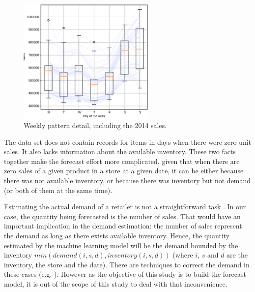 \begin{figure}
	\centering
	\includegraphics[width=0.6\textwidth]{salesforecast/images/timeseries_dow}
	\caption{Weekly pattern detail, including the 2014 sales.}
	\label{fig:timeseries_detail}
\end{figure}

The data set does not contain records for items in days when there were zero unit sales. It also lacks information about the available inventory. These two facts together make the forecast effort more complicated, given that when there are zero sales of a given product in a store at a given date, it can be either because there was not available inventory, or because there was inventory but not demand (or both of them at the same time).

Estimating the actual demand of a retailer is not a straightforward task \autocite{Deep2019}. In our case, the quantity being forecasted is the number of sales. That would have an important implication in the demand estimation: the number of sales represent the demand as long as there exists available inventory. Hence, the quantity estimated by the machine learning model will be the demand bounded by the inventory $min(demand(i,s,d), inventory(i,s,d))$ (where $i$, $s$ and $d$ are the inventory, the store and the date). There are techniques to correct the demand in these cases (e.g. \autocite{Bell2000}). However as the objective of this study is to build the forecast model, it is out of the scope of this study to deal with that inconvenience.

